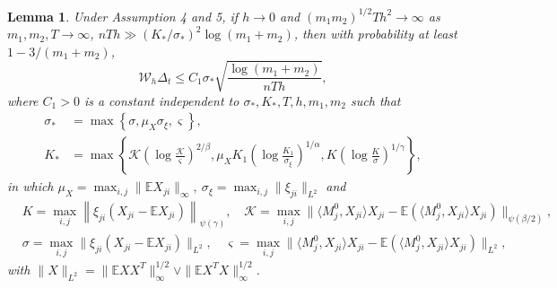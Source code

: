 \documentclass[12pt]{article}
\newtheorem{lemma}{Lemma}
\begin{document}
 \begin{lemma}
  \label{lem_lambda_indpdt}
  Under Assumption 4 and 5, if $h\rightarrow0$ and $(m_1m_2)^{1/2}Th^2\rightarrow\infty$ as $m_1,m_2,T\rightarrow\infty$, $nTh\gg (K_*/\sigma_*)^2\log(m_1+m_2)$, then with probability at least $1-3/(m_1+m_2)$, 
  \begin{equation}\label{lambda_bound_indpdt}
  \mathcal{W}_h\Delta_{t}  \le
  C_1\sigma_*\sqrt{\frac{\log(m_1+m_2)}{nTh}},
  \end{equation}
  where  $C_1>0$ is a constant  independent to $\sigma_*,K_*,T,h,m_1,m_2$ such that
  \begin{align*}
     \sigma_*& =\max \left\{\sigma ,\mu_X\sigma_\xi,\varsigma \right\},\\
  K_*&=\max\left\{\mathcal{K}\left(\log \frac{\mathcal{K}}{\varsigma}\right)^{2/\beta},\mu_X K_1 \left(\log \frac{K_1}{\sigma_\xi}\right)^{1/\alpha}, K\left(\log \frac{K}{\sigma}\right)^{1/\gamma}\right\},
  \end{align*}
  in which $\mu_X  =\max_{i,j} \|\mathbb{E} X_{ji}\|_{\infty},\ \sigma_\xi = \max_{i,j}\|\xi_{ji}\|_{L^2}$ and
  \begin{equation*}
    \begin{aligned}
     & K=  \max_{i,j} \left \| \xi_{ji} (X_{ji} - \mathbb{E}X_{ji})\right\|_{\psi(\gamma)},\quad \mathcal{K}=\max_{i,j} \| \langle M_j^0, X_{ji}\rangle X_{ji} - \mathbb{E}(\langle M^0_j, X_{ji}\rangle X_{ji})\|_{\psi(\beta/2)},\\
  & \sigma= \max_{i,j} \| \xi_{ji} (X_{ji} - \mathbb{E}X_{ji})\|_{L^{2}}, \quad \varsigma =\max_{i,j}\|\langle M_j^0, X_{ji}\rangle X_{ji} - \mathbb{E}(\langle M^0_j, X_{ji}\rangle X_{ji})\|_{L^2},
    \end{aligned}
  \end{equation*}
  with $\|X\|_{L^2}=\|\mathbb{E}XX^T\|_{\infty}^{1/2}\vee\|\mathbb{E}X^TX\|_{\infty}^{1/2}$.%
  \end{lemma}
\end{document}
